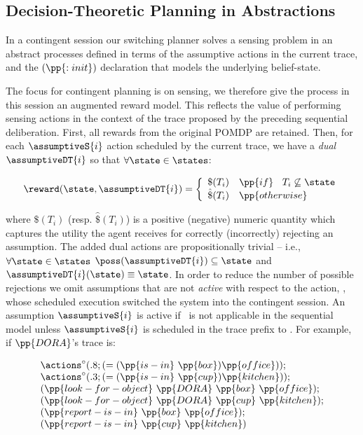 
\subsection{Decision-Theoretic Planning in Abstractions}

In a contingent session our switching planner solves a sensing problem
in an abstract processes defined in terms of the assumptive actions in
the current trace, and the $(\pp{:init})$ declaration that models the
underlying belief-state.

The focus for contingent planning is on sensing, we therefore give the
process in this session an augmented reward model.  This reflects the
value of performing sensing actions in the context of the trace
proposed by the preceding sequential deliberation. First, all rewards
from the original POMDP are retained. Then, for each $\assumptiveS{i}$
action scheduled by the current trace, we have a {\em dual}
$\assumptiveDT{i}$ so that $\forall\state\in\states$:

\[
\reward(\state, \assumptiveDT{i}) = \bigg\{ \begin{array}{ll}
\$(T_i) & \pp{if}~\;\;T_i \not\subseteq \state \\
\hat\$(T_i) & \pp{otherwise} \\
\end{array}
\]

\noindent where $\$(T_i)$ (resp. $\hat\$(T_i)$) is a positive
(negative) numeric quantity which captures the utility the agent
receives for correctly (incorrectly) rejecting an assumption. The
added dual actions are propositionally trivial -- i.e.,
$\forall\state\in\states$ $\poss(\assumptiveDT{i})
\subseteq \state$ and $\assumptiveDT{i}(\state) \equiv \state$.  
In order to reduce the number of possible rejections we omit
assumptions that are not {\em active} with respect to the action,
\switchAction, whose scheduled execution switched the system into
the contingent session. An assumption $\assumptiveS{i}$ is active if
\switchAction\ is not applicable in the sequential model unless
$\assumptiveS{i}$ is scheduled in the trace prefix
to \switchAction. For example, if $\pp{DORA}$'s trace is:

\[
\begin{array}{l}
\actions^{\circ}(.8;(=(\pp{is-in}~\pp{box})\pp{office}));\\
\actions^{\circ}(.3;(=(\pp{is-in}~\pp{cup})\pp{kitchen}));\\
(\pp{look-for-object}~\pp{DORA}~\pp{box}~\pp{office});\\
(\pp{look-for-object}~\pp{DORA}~\pp{cup}~\pp{kitchen});\\
(\pp{report-is-in}~\pp{box}~\pp{office}); \\
(\pp{report-is-in}~\pp{cup}~\pp{kitchen})
\end{array}
\]

